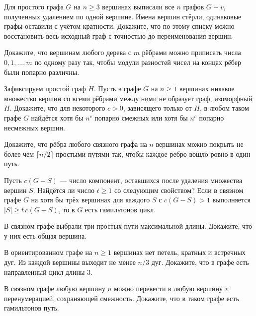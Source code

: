 

\ifPDFTeX
  \renewcommand{\rmdefault}{cmr}
\fi

\def\SheetNo{9}
\setlength{\emergencystretch}{2em}




\begin{problems}

\item Для простого графа $G$ на $n\ge3$ вершинах выписали все $n$ графов $G-v$, полученных удалением по одной вершине. Имена вершин стёрли, одинаковые графы оставили с учётом кратности. Докажите, что по этому списку можно восстановить весь исходный граф с точностью до переименования вершин.

\item Докажите, что вершинам любого дерева с $m$ рёбрами можно приписать числа $0,1,\ldots,m$ по одному разу так, чтобы модули разностей чисел на концах рёбер были попарно различны.

\item Зафиксируем простой граф $H$. Пусть в графе $G$ на $n\ge1$ вершинах никакое множество вершин со всеми рёбрами между ними не образует граф, изоморфный $H$. Докажите, что для некоторого $c>0$, зависящего только от $H$, в любом таком графе $G$ найдётся хотя бы $n^c$ попарно смежных или хотя бы $n^c$ попарно несмежных вершин.

\item Докажите, что рёбра любого связного графа на $n$ вершинах можно покрыть не более чем $\lceil n/2\rceil$ простыми путями так, чтобы каждое ребро вошло ровно в один путь.

\item Пусть $c(G-S)$ --- число компонент, оставшихся после удаления множества вершин $S$. Найдётся ли число $t\ge1$ со следующим свойством? Если в связном графе $G$ на хотя бы трёх вершинах для каждого $S$ с $c(G-S)>1$ выполняется $|S|\ge t\,c(G-S)$, то в $G$ есть гамильтонов цикл.

\item В связном графе выбрали три простых пути максимальной длины. Докажите, что у них есть общая вершина.

\item В ориентированном графе на $n\ge1$ вершинах нет петель, кратных и встречных дуг. Из каждой вершины выходит не менее $n/3$ дуг. Докажите, что в графе есть направленный цикл длины $3$.

\item В связном графе любую вершину $u$ можно перевести в любую вершину $v$ перенумерацией, сохраняющей смежность. Докажите, что в таком графе есть гамильтонов путь.


\end{problems}
